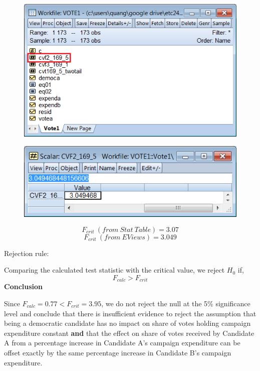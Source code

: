 \documentclass[12pt]{report}
\begin{document}
\vspace{-\baselineskip}
\begin{figure}[H]
	\centering
	\includegraphics{q1_21}
\end{figure}
\vspace{-\baselineskip}
\begin{figure}[H]
	\centering
	\includegraphics{q1_22}
\end{figure}
\vspace{-\baselineskip}
$$F_{crit}\ (from\ Stat\ Table) = 3.07$$
$$F_{crit}\ (from\ EViews) = 3.049$$

\noindent Rejection rule: 

\noindent Comparing the calculated test statistic with the critical value, we reject $H_0$ if,
$$F_{calc} > F_{crit}$$
\noindent \textbf{Conclusion}

\noindent Since $F_{calc}=0.77 < F_{crit}=3.95$, we do not reject the null at the 5\% significance level and conclude that there is insufficient evidence to reject the assumption that being a democratic candidate has no impact on share of votes holding campaign expenditure constant \textbf{and} that the effect on share of votes received by Candidate A from a percentage increase in Candidate A’s campaign expenditure can be offset exactly by the same percentage increase in Candidate B’s campaign expenditure.
\end{document}
